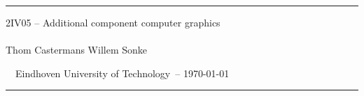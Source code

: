 \begin{adjustwidth}{0.05\textwidth}{0.05\textwidth}  
  \textcolor{accgblue}{\rule{0.9\textwidth}{0.8pt}}
  
  \begin{center}
    \large 2IV05 -- Additional component computer graphics\\
    \Large\textbf{\accgtitle}\\[10pt]
    \normalsize Thom Castermans \qquad Willem Sonke
  \end{center}
  
  \vspace{10pt}\noindent\footnotesize~~Eindhoven University of Technology\hfill\accgversion\ -- \today~~
  
  \vspace{-6pt}\noindent\textcolor{accgblue}{\rule{0.9\textwidth}{0.8pt}}
\end{adjustwidth}

